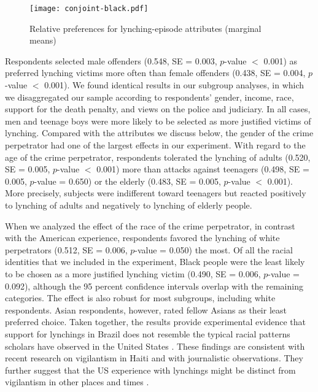 \documentclass[12pt,ansiapaper]{article}
\begin{document}
\begin{figure}[ht]
\texttt{[image: conjoint-black.pdf]}
\caption{Relative preferences for lynching-episode attributes (marginal means)}
\centering
\label{fig:exp01}
\end{figure}

Respondents selected male offenders (0.548, SE = 0.003, $p$-value $<$ 0.001) as preferred lynching victims more often than female offenders (0.438, SE = 0.004, $p$-value $<$ 0.001). We found identical results in our subgroup analyses, in which we disaggregated our sample according to respondents' gender, income, race, support for the death penalty, and views on the police and judiciary. In all cases, men and teenage boys were more likely to be selected as more justified victims of lynching. Compared with the attributes we discuss below, the gender of the crime perpetrator had one of the largest effects in our experiment. With regard to the age of the crime perpetrator, respondents tolerated the lynching of adults (0.520, SE = 0.005, $p$-value $<$ 0.001) more than attacks against teenagers (0.498, SE = 0.005, $p$-value = 0.650) or the elderly (0.483, SE = 0.005, $p$-value $<$ 0.001). More precisely, subjects were indifferent toward teenagers but reacted positively to lynching of adults and negatively to lynching of elderly people.

When we analyzed the effect of the race of the crime perpetrator, in contrast with the American experience, respondents favored the lynching of white perpetrators (0.512, SE = 0.006, $p$-value = 0.050) the most. Of all the racial identities that we included in the experiment, Black people were the least likely to be chosen as a more justified lynching victim (0.490, SE = 0.006, $p$-value = 0.092), although the 95 percent confidence intervals overlap with the remaining categories. The effect is also robust for most subgroups, including white respondents. Asian respondents, however, rated fellow Asians as their least preferred choice. Taken together, the results provide experimental evidence that support for lynchings in Brazil does not resemble the typical racial patterns scholars have observed in the United States \citep{dray2003hands,seguin2019national,obert2018keeping}. These findings are consistent with recent research on vigilantism in Haiti \citep{jung2020lynching} and with journalistic observations. They further suggest that the US experience with lynchings might be distinct from vigilantism in other places and times \citep{oliveira2016mob}. 
\end{document}
